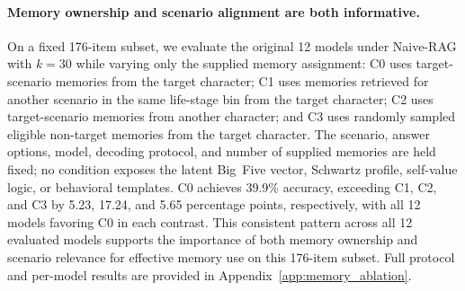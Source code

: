 \documentclass[11pt]{article}
\begin{document}
\paragraph{Memory ownership and scenario alignment are both informative.} On a fixed 176-item subset, we evaluate the original 12 models under Naive-RAG with $k{=}30$ while varying only the supplied memory assignment: C0 uses target-scenario memories from the target character; C1 uses memories retrieved for another scenario in the same life-stage bin from the target character; C2 uses target-scenario memories from another character; and C3 uses randomly sampled eligible non-target memories from the target character. The scenario, answer options, model, decoding protocol, and number of supplied memories are held fixed; no condition exposes the latent Big~Five vector, Schwartz profile, self-value logic, or behavioral templates. C0 achieves 39.9\% accuracy, exceeding C1, C2, and C3 by 5.23, 17.24, and 5.65 percentage points, respectively, with all 12 models favoring C0 in each contrast. This consistent pattern across all 12 evaluated models supports the importance of both memory ownership and scenario relevance for effective memory use on this 176-item subset. Full protocol and per-model results are provided in Appendix~\ref{app:memory_ablation}.
\end{document}
